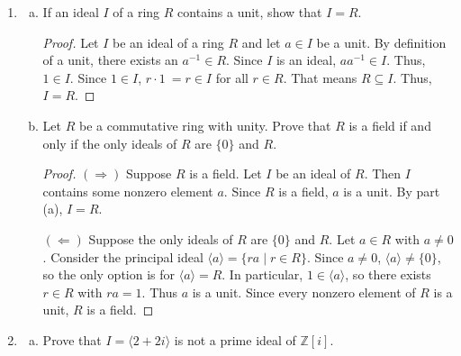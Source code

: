 \documentclass[12pt, letterpaper]{article}
\newcommand{\Z}{\mathbb{Z}}
\begin{document}
\begin{enumerate}
\begin{enumerate}[(a)]
\begin{proof}
        \end{proof}
    \end{enumerate}

    \item %
    \begin{enumerate}[(a)]
        \item If an ideal $I$ of a ring $R$ contains a unit, show that $I = R$.

        \begin{proof}
            Let $I$ be an ideal of a ring $R$ and let $a \in I$ be a unit. By definition of a unit, there exists an $a^{-1} \in R$. Since $I$ is an ideal, $aa^{-1} \in I$. Thus, $1 \in I$.
            Since $1 \in I$, $r \cdot 1 \ = r \in I$ for all $r \in R$. That means $R \subseteq I$.  Thus, $I = R$.
        \end{proof}

        \item Let $R$ be a commutative ring with unity. Prove that $R$ is a field if and only if the only ideals of $R$ are $\{0\}$ and $R$.

        \begin{proof}
            $(\Rightarrow)$ Suppose $R$ is a field. Let $I$ be an ideal of $R$. Then $I$ contains some
            nonzero element $a$. Since $R$ is a field, $a$ is a unit. By part (a), $I = R$.

            $(\Leftarrow)$ Suppose the only ideals of $R$ are $\{0\}$ and $R$. Let $a \in R$ with $a \neq 0$.
            Consider the principal ideal $\langle a \rangle = \{ra \mid r \in R\}$. Since $a \neq 0$, $\langle a \rangle \neq \{0\}$,
            so the only option is for $\langle a \rangle = R$. In particular, $1 \in \langle a \rangle$, so there exists $r \in R$ with $ra = 1$.
            Thus $a$ is a unit. Since every nonzero element of $R$ is a unit, $R$ is a field.
        \end{proof}
    \end{enumerate}

    \item %
    \begin{enumerate}[(a)]
        \item Prove that $I = \langle 2 + 2i \rangle$ is not a prime ideal of $\Z[i]$.


\end{enumerate}
\end{enumerate}
\end{document}
